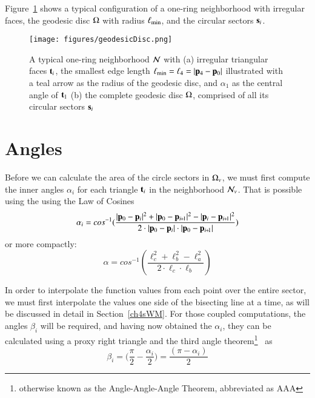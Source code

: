 Figure~\ref{fig:geodesicDisc} shows a typical configuration of a one-ring neighborhood with irregular faces, the geodesic disc $\Omega$ with radius $\ell_\text{min}$, and the circular sectors $\mathbf{s}_i$.

\begin{figure}[ht]
\ffigbox
	{\texttt{[image: figures/geodesicDisc.png]}}
	{\caption[One-ring and geodesic disc]{A typical one-ring neighborhood $\mathcal{N}$ with (a) irregular triangular faces $\mathbf{t}_i$, the smallest edge length $\ell_\text{min} = \ell_4 = |\mathbf{p}_4 - \mathbf{p}_0|$ illustrated with a teal arrow as the radius of the geodesic disc, and $\alpha_1$ as the central angle of $\mathbf{t}_1$ (b) the complete geodesic disc $\Omega$, comprised of all its circular sectors $\mathbf{s}_i$}\label{fig:geodesicDisc}}
\end{figure}%

%
%
%
%
\section{Angles}
\label{ch4sA}
Before we can calculate the area of the circle sectors in $\Omega_v$, we must first compute the inner angles $\alpha_i$ for each triangle $\mathbf{t}_i$ in the neighborhood $\mathcal{N}_v$. That is possible using the using the Law of Cosines~\cite{Weisstein19e}
%
\begin{equation}
	\alpha_i = cos^{-1}(\frac{|\bp_0 - \bp_{i}|^2 + |\bp_0 - \bp_{\sipo}|^2 - |\bp_i - \bp_{\sipo}|^2}{2\cdot|\bp_0 - \bp_{i}|\cdot|\bp_0 - \bp_{\sipo}|})
\end{equation}
%
or more compactly:
%
\begin{equation}
	\alpha = cos^{-1}\left (\frac{\ell_c^2 + \ell_b^2 - \ell_a^2}{2\cdot\ell_c\cdot\ell_b}\right )
	\label{eq:alphaFromEdgeLengths}
\end{equation}%
%

In order to interpolate the function values from each point over the entire sector, we must first interpolate the values one side of the bisecting line at a time, as will be discussed in detail in Section~\ref{ch4sWM}. For those coupled computations, the angles $\beta_i$ will be required, and having now obtained the $\alpha_i$, they can be calculated using a proxy right triangle and the third angle theorem\footnote{otherwise known as the Angle-Angle-Angle Theorem, abbreviated as AAA}~\cite{Weisstein19f} as
%
\begin{equation}
	\beta_i = \Big(\frac{\pi}{2} - \frac{\alpha_i}{2}\Big) = \frac{(\pi - \alpha_i)}{2}
	\label{eq:betaFromHalfAlpha}
\end{equation}%
%


